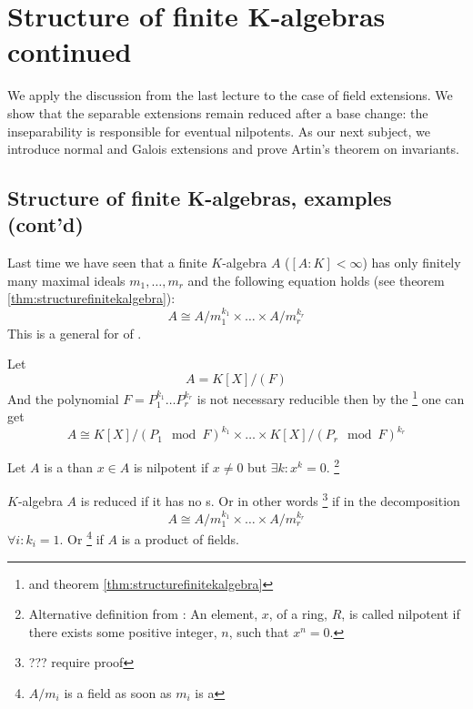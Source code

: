 \chapter{Structure of finite K-algebras continued}

We apply the discussion from the last lecture to the case of field
extensions. We show that the separable extensions remain reduced after
a base change: the inseparability is responsible for eventual
nilpotents. As our next subject, we introduce normal and Galois
extensions and prove Artin's theorem on invariants.

\section{Structure of finite K-algebras, examples (cont'd)}

Last time we have seen that a finite $K$-algebra $A$
($\left[A:K\right] < \infty$) has only finitely many maximal ideals
$m_1, \dots, m_r$ and the following equation holds (see theorem
\ref{thm:structurefinitekalgebra}):
\[
A \cong A/m_1^{k_1} \times \dots \times A/m_r^{k_r}
\]
This is a general for of .

\begin{example}
  Let
  \[
  A = K\left[X\right]/\left(F\right)
  \]
  And the polynomial $F = P_1^{k_1} \dots P_r^{k_r}$ is not necessary
  reducible then by the  
  \footnote{
    and theorem \ref{thm:structurefinitekalgebra}
  }
  one can get
  \[
  A \cong
  K\left[X\right]/\left(P_1 \mod F \right)^{k_1} \times \dots
  \times K\left[X\right]/\left(P_r \mod F \right)^{k_r}
  \]
\end{example}

\begin{definition}
  Let $A$ is a  than $x \in A$ is nilpotent if $x \ne 0$ but
  $\exists k: x^k = 0$.
  \footnote{
    Alternative definition from \cite{wiki:nilpotent}: An element,
    $x$, of a ring, $R$, is called nilpotent if there exists 
    some positive integer, $n$, such that $x^n = 0$.
  }
  \label{def:nilpotent}
\end{definition}

\begin{definition}[reduced]
  $K$-algebra $A$ is reduced if it has no s.
  Or in other words
  \footnote{
    ??? require proof
  }
  if in the decomposition
  \[
  A \cong A/m_1^{k_1} \times \dots \times A/m_r^{k_r}
  \]
  $\forall i: k_i = 1$.
  Or 
  \footnote{
    $A/m_i$ is a field as soon as $m_i$ is a 
  }
  if $A$ is a product of fields. 
  \label{def:reduced}
\end{definition}

